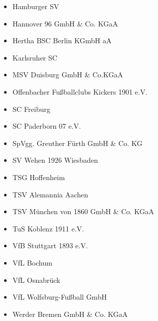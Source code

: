 \begin{multicols}{2}
\begin{itemize}
		\item Hamburger SV

		\item Hannover 96 GmbH \& Co. KGaA

		\item Hertha BSC Berlin KGmbH aA

		\item Karlsruher SC

		\item MSV Duisburg GmbH \& Co.KGaA

		\item Offenbacher Fußballclubs Kickers 1901 e.V.

		\item SC Freiburg

		\item SC Paderborn 07 e.V.

		\item SpVgg. Greuther Fürth GmbH \& Co. KG

		\item SV Wehen 1926 Wiesbaden

		\item TSG Hoffenheim

		\item TSV Alemannia Aachen

		\item TSV München von 1860 GmbH \& Co. KGaA

		\item TuS Koblenz 1911 e.V.

		\item VfB Stuttgart 1893 e.V.

		\item VfL Bochum

		\item VfL Osnabrück

		\item VfL Wolfsburg-Fußball GmbH

		\item Werder Bremen GmbH \& Co. KGaA

	\end{itemize}
\end{multicols}



